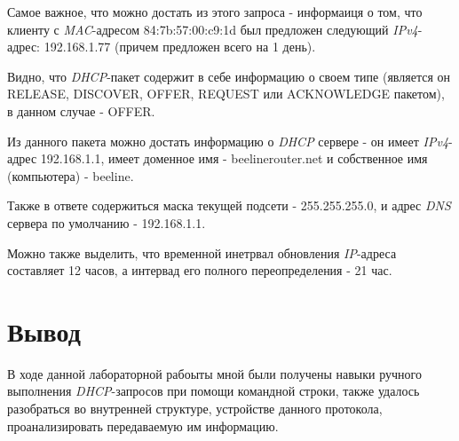 \documentclass[a4paper]{article}
\begin{document}
  Самое важное, что можно достать из этого запроса - информаиця о том, что клиенту
  с \textit{MAC}-адресом 84:7b:57:00:c9:1d был предложен следующий \textit{IPv4}-адрес:
  192.168.1.77 (причем предложен всего на 1 день).

  Видно, что \textit{DHCP}-пакет содержит в себе информацию о своем типе (является он 
  RELEASE, DISCOVER, OFFER, REQUEST или ACKNOWLEDGE пакетом), в данном случае - OFFER.

  Из данного пакета можно достать информацию о \textit{DHCP} сервере -
  он имеет \textit{IPv4}-адрес 192.168.1.1, имеет доменное имя - beelinerouter.net
  и собственное имя (компьютера) - beeline.

  Также в ответе содержиться маска текущей подсети - 255.255.255.0, и адрес
  \textit{DNS} сервера по умолчанию - 192.168.1.1.

  Можно также выделить, что временной инетрвал обновления \textit{IP}-адреса
  составляет 12 часов, а интервад его полного переопределения - 21 час.

  \section{Вывод}

  В ходе данной лабораторной рабоыты мной были получены навыки ручного выполнения 
  \textit{DHCP}-запросов при помощи командной строки, также удалось разобраться
  во внутренней структуре, устройстве данного протокола, проанализировать
  передаваемую им информацию.
\end{document}
